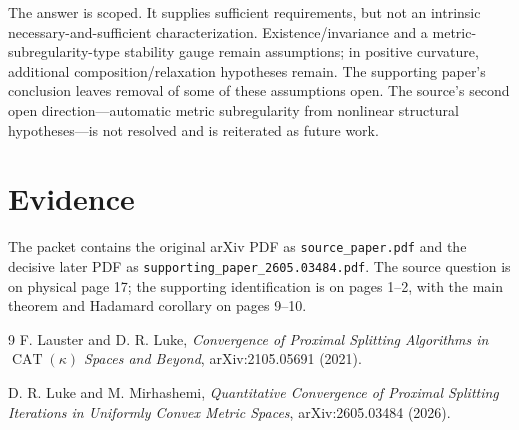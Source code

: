 \documentclass[11pt]{article}
\begin{document}
The answer is scoped.  It supplies sufficient requirements, but not an
intrinsic necessary-and-sufficient characterization.  Existence/invariance
and a metric-subregularity-type stability gauge remain assumptions; in
positive curvature, additional composition/relaxation hypotheses remain.
The supporting paper's conclusion leaves removal of some of these assumptions
open.  The source's second open direction---automatic metric subregularity
from nonlinear structural hypotheses---is not resolved and is reiterated as
future work.

\section*{Evidence}
The packet contains the original arXiv PDF as \texttt{source\_paper.pdf} and
the decisive later PDF as
\texttt{supporting\_paper\_2605.03484.pdf}.  The source question is on physical
page 17; the supporting identification is on pages 1--2, with the main theorem
and Hadamard corollary on pages 9--10.

\begin{thebibliography}{9}
F. Lauster and D. R. Luke,
\emph{Convergence of Proximal Splitting Algorithms in
$\operatorname{CAT}(\kappa)$ Spaces and Beyond}, arXiv:2105.05691 (2021).

D. R. Luke and M. Mirhashemi,
\emph{Quantitative Convergence of Proximal Splitting Iterations in Uniformly
Convex Metric Spaces}, arXiv:2605.03484 (2026).
\end{thebibliography}
\end{document}

